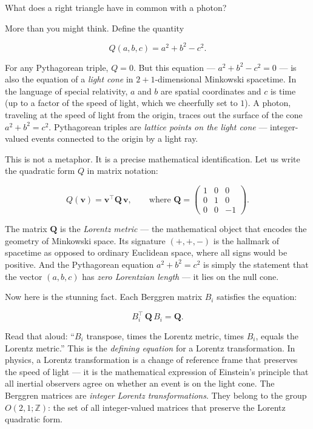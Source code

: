 What does a right triangle have in common with a photon?

More than you might think. Define the quantity

\[Q(a, b, c) = a^2 + b^2 - c^2.\]

For any Pythagorean triple, \(Q = 0\). But this equation --- \(a^2 + b^2 - c^2 = 0\) --- is also the equation of a \emph{light cone} in \(2 + 1\)-dimensional Minkowski spacetime. In the language of special relativity, \(a\) and \(b\) are spatial coordinates and \(c\) is time (up to a factor of the speed of light, which we cheerfully set to \(1\)). A photon, traveling at the speed of light from the origin, traces out the surface of the cone \(a^2 + b^2 = c^2\). Pythagorean triples are \emph{lattice points on the light cone} --- integer-valued events connected to the origin by a light ray.

This is not a metaphor. It is a precise mathematical identification. Let us write the quadratic form \(Q\) in matrix notation:

\[Q(\mathbf{v}) = \mathbf{v}^\top \mathbf{Q} \, \mathbf{v}, \qquad \text{where } \mathbf{Q} = \begin{pmatrix} 1 & 0 & 0 \\ 0 & 1 & 0 \\ 0 & 0 & -1 \end{pmatrix}.\]

The matrix \(\mathbf{Q}\) is the \emph{Lorentz metric} --- the mathematical object that encodes the geometry of Minkowski space. Its signature \((+, +, -)\) is the hallmark of spacetime as opposed to ordinary Euclidean space, where all signs would be positive. And the Pythagorean equation \(a^2 + b^2 = c^2\) is simply the statement that the vector \((a, b, c)\) has \emph{zero Lorentzian length} --- it lies on the null cone.

Now here is the stunning fact. Each Berggren matrix \(B_i\) satisfies the equation:

\[B_i^\top \, \mathbf{Q} \, B_i = \mathbf{Q}.\]

Read that aloud: ``\(B_i\) transpose, times the Lorentz metric, times \(B_i\), equals the Lorentz metric.'' This is the \emph{defining equation} for a Lorentz transformation. In physics, a Lorentz transformation is a change of reference frame that preserves the speed of light --- it is the mathematical expression of Einstein's principle that all inertial observers agree on whether an event is on the light cone. The Berggren matrices are \emph{integer Lorentz transformations}. They belong to the group \(O(2, 1; \mathbb{Z})\): the set of all integer-valued matrices that preserve the Lorentz quadratic form.

